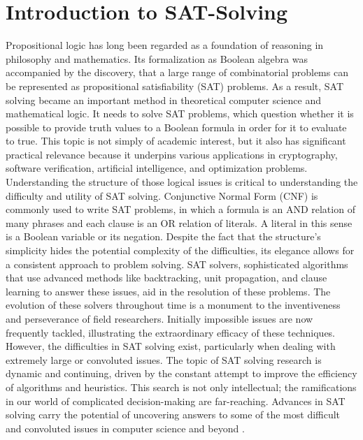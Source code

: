 \documentclass[bachelor, english]{algothesis}
\begin{document}
\section{Introduction to SAT-Solving}
Propositional logic has long been regarded as a foundation of reasoning in philosophy and mathematics. Its formalization as Boolean algebra was accompanied by the discovery, that a large range of combinatorial problems can be represented as propositional satisfiability (SAT) problems. As a result, SAT solving became an important method in theoretical computer science and mathematical logic. It needs to solve SAT problems, which question whether it is possible to provide truth values to a Boolean formula in order for it to evaluate to true. This topic is not simply of academic interest, but it also has significant practical relevance because it underpins various applications in cryptography, software verification, artificial intelligence, and optimization problems. Understanding the structure of those logical issues is critical to understanding the difficulty and utility of SAT solving. \newline
Conjunctive Normal Form (CNF) is commonly used to write SAT problems, in which a formula is an AND relation of many phrases and each clause is an OR relation of literals. A literal in this sense is a Boolean variable or its negation. Despite the fact that the structure's simplicity hides the potential complexity of the difficulties, its elegance allows for a consistent approach to problem solving. SAT solvers, sophisticated algorithms that use advanced methods like backtracking, unit propagation, and clause learning to answer these issues, aid in the resolution of these problems. The evolution of these solvers throughout time is a monument to the inventiveness and perseverance of field researchers. Initially impossible issues are now frequently tackled, illustrating the extraordinary efficacy of these techniques. However, the difficulties in SAT solving exist, particularly when dealing with extremely large or convoluted issues. \newline
The topic of SAT solving research is dynamic and continuing, driven by the constant attempt to improve the efficiency of algorithms and heuristics. This search is not only intellectual; the ramifications in our world of complicated decision-making are far-reaching. Advances in SAT solving carry the potential of uncovering answers to some of the most difficult and convoluted issues in computer science and beyond \cite{Sat_solving}.
\end{document}
